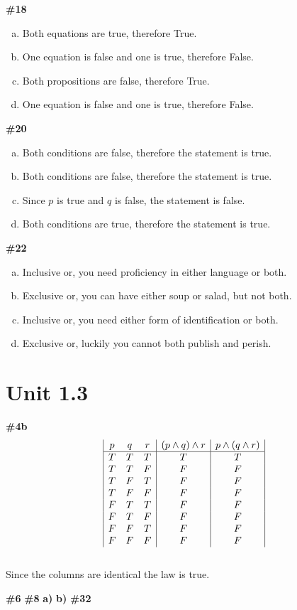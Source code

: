 \documentclass{article}
\newcommand{\unit}[1]{\section{Unit #1}}
\newcommand{\problem}[1]{\textbf{\##1}}
\newcommand{\prob}[1]{\problem{#1}}
\begin{document}
\problem{18}
\begin{enumerate}[a)]
    \item Both equations are true, therefore True.
    \item One equation is false and one is true, therefore False.
    \item Both propositions are false, therefore True.
    \item One equation is false and one is true, therefore False.
\end{enumerate}
\pagebreak
\problem{20}
\begin{enumerate}[a)]
    \item Both conditions are false, therefore the statement is true.
    \item Both conditions are false, therefore the statement is true.
    \item Since \(p\) is true and \(q\) is false, the statement is false.
    \item Both conditions are true, therefore the statement is true.
\end{enumerate}
\problem{22}
\begin{enumerate}[a)]
    \item Inclusive or, you need proficiency in either language or both.
    \item Exclusive or, you can have either soup or salad, but not both.
    \item Inclusive or, you need either form of identification or both.
    \item Exclusive or, luckily you cannot both publish and perish.
\end{enumerate}
\pagebreak
\unit{1.3}
\problem{4b}
\begin{displaymath}
    \begin{array}{|c c c|c|c|}

    p & q & r & (p \wedge q)\wedge r & p \wedge(q \wedge r) \\
    \hline
    T & T & T & T           & T           \\
    T & T & F & F           & F           \\
    T & F & T & F           & F           \\
    T & F & F & F           & F           \\
    F & T & T & F           & F           \\
    F & T & F & F           & F           \\
    F & F & T & F           & F           \\
    F & F & F & F           & F          
    \end{array}
\end{displaymath}
\\
Since the columns are identical the law is true.

\problem{6}
\problem{8}
\textbf{a)}
\textbf{b)}
\prob{32}


\pagebreak
\end{document}
